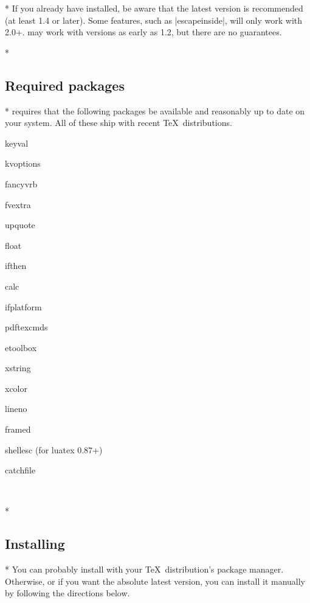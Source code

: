 \begin{paracol}{2}
\switchcolumn
\switchcolumn[0]*%
If you already have  installed, be aware that the latest version is recommended (at least 1.4 or later).  Some features, such as |escapeinside|, will only work with 2.0+.   may work with versions as early as 1.2, but there are no guarantees.

\switchcolumn
\switchcolumn[0]*%
\subsection{Required packages}

\switchcolumn
\switchcolumn[0]*%
 requires that the following packages be available and reasonably up to date on your system.  All of these ship with recent \TeX\ distributions.

\begin{multicols}{3}
\begingroup
\setlength\parskip{0pt}
\setlength\topsep{0pt}
\begin{list}{\textrm{}}{\ttfamily}
  \item keyval
  \item kvoptions
  \item fancyvrb
  \item fvextra
  \item upquote
  \item float
  \item ifthen
  \item calc
  \item ifplatform
  \item pdftexcmds
  \item etoolbox
  \item xstring
  \item xcolor
  \item lineno
  \item framed
  \item shellesc (for luatex 0.87+)
  \item catchfile

  ~
\end{list}
\endgroup
\end{multicols}

\switchcolumn
\switchcolumn[0]*%
\subsection{Installing }
\label{sec:installing:installing}

\switchcolumn
\switchcolumn[0]*%
You can probably install  with your \TeX\ distribution's package manager.  Otherwise, or if you want the absolute latest version, you can install it manually by following the directions below.


\end{paracol}
